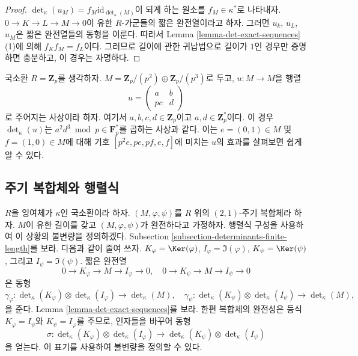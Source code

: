 \begin{proof}
$\det\nolimits_\kappa(u_M) = f_M \text{id}_{\det\nolimits_\kappa(M)}$이
되게 하는 원소를 $f_M \in \kappa^*$로 나타내자.
$0 \to K \to L \to M \to 0$이 유한 $R$-가군들의 짧은 완전열이라고
하자. 그러면 $u_k$, $u_L$, $u_M$은 짧은 완전열들의 동형을 이룬다.
따라서 Lemma \ref{lemma-det-exact-sequences} (1)에 의해
$f_K f_M = f_L$이다. 그러므로 길이에 관한 귀납법으로 길이가 $1$인
경우만 증명하면 충분하고, 이 경우는 자명하다.
\end{proof}

\begin{example}
\label{example-determinant-map}
국소환 $R = \mathbf{Z}_p$를 생각하자.
$M = \mathbf{Z}_p/(p^2) \oplus \mathbf{Z}_p/(p^3)$로 두고,
$u : M \to M$을 행렬
$$
u =
\left(
\begin{matrix}
a & b \\
pc & d
\end{matrix}
\right)
$$
로 주어지는 사상이라 하자. 여기서 $a, b, c, d \in \mathbf{Z}_p$이고
$a, d \in \mathbf{Z}_p^*$이다. 이 경우 $\det_\kappa(u)$는
$a^2d^3 \bmod p \in \mathbf{F}_p^*$를 곱하는 사상과 같다. 이는
$e = (0 , 1) \in M$ 및 $f = (1, 0) \in M$에 대해 기호
$[p^2e, pe, pf, e, f]$에 미치는 $u$의 효과를 살펴보면 쉽게 알 수
있다.
\end{example}





\subsection{주기 복합체와 행렬식}
\label{subsection-periodic-complexes-determinants}

\noindent
$R$을 잉여체가 $\kappa$인 국소환이라 하자. $(M, \varphi, \psi)$를
$R$ 위의 $(2, 1)$-주기 복합체라 하자. $M$이 유한 길이를 갖고
$(M, \varphi, \psi)$가 완전하다고 가정하자. 행렬식 구성을 사용하여
이 상황의 불변량을 정의하겠다. Subsection
\ref{subsection-determinants-finite-length}를 보라. 다음과 같이 줄여 쓰자.
$K_\varphi = \Ker(\varphi)$,
$I_\varphi = \Im(\varphi)$,
$K_\psi = \Ker(\psi)$, 그리고
$I_\psi = \Im(\psi)$.
짧은 완전열
$$
0 \to K_\varphi \to M \to I_\varphi \to 0, \quad
0 \to K_\psi \to M \to I_\psi \to 0
$$
은 동형
$$
\gamma_\varphi :
\det\nolimits_\kappa(K_\varphi)
\otimes
\det\nolimits_\kappa(I_\varphi)
\longrightarrow
\det\nolimits_\kappa(M), \quad
\gamma_\psi :
\det\nolimits_\kappa(K_\psi)
\otimes
\det\nolimits_\kappa(I_\psi)
\longrightarrow
\det\nolimits_\kappa(M),
$$
을 준다. Lemma \ref{lemma-det-exact-sequences}를 보라. 한편 복합체의
완전성은 등식 $K_\varphi = I_\psi$와 $K_\psi = I_\varphi$를 주므로,
인자들을 바꾸어 동형
$$
\sigma :
\det\nolimits_\kappa(K_\varphi)
\otimes
\det\nolimits_\kappa(I_\varphi)
\longrightarrow
\det\nolimits_\kappa(K_\psi)
\otimes
\det\nolimits_\kappa(I_\psi)
$$
을 얻는다. 이 표기를 사용하여 불변량을 정의할 수 있다.

